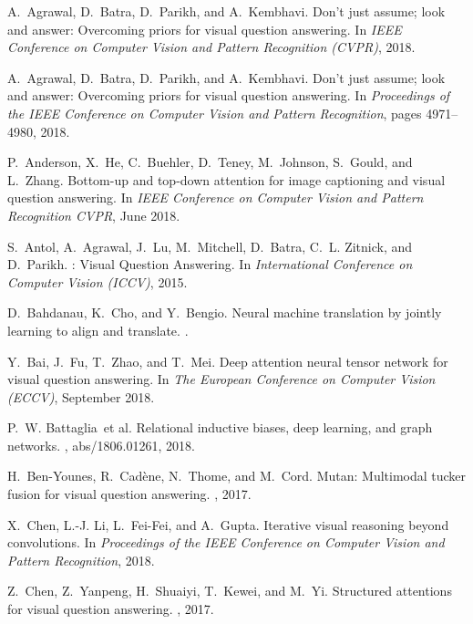 \documentclass[10pt,twocolumn,letterpaper]{article}
\begin{document}
\begin{thebibliography}{10}\itemsep=-1pt

A.~Agrawal, D.~Batra, D.~Parikh, and A.~Kembhavi.
\newblock Don't just assume; look and answer: Overcoming priors for visual
  question answering.
\newblock In {\em IEEE Conference on Computer Vision and Pattern Recognition
  (CVPR)}, 2018.

A.~Agrawal, D.~Batra, D.~Parikh, and A.~Kembhavi.
\newblock Don’t just assume; look and answer: Overcoming priors for visual
  question answering.
\newblock In {\em Proceedings of the IEEE Conference on Computer Vision and
  Pattern Recognition}, pages 4971--4980, 2018.

P.~Anderson, X.~He, C.~Buehler, D.~Teney, M.~Johnson, S.~Gould, and L.~Zhang.
\newblock Bottom-up and top-down attention for image captioning and visual
  question answering.
\newblock In {\em {IEEE} Conference on Computer Vision and Pattern Recognition
  {CVPR}}, June 2018.

S.~Antol, A.~Agrawal, J.~Lu, M.~Mitchell, D.~Batra, C.~L. Zitnick, and
  D.~Parikh.
: {V}isual {Q}uestion {A}nswering.
\newblock In {\em International Conference on Computer Vision (ICCV)}, 2015.

D.~Bahdanau, K.~Cho, and Y.~Bengio.
\newblock Neural machine translation by jointly learning to align and
  translate.
.

Y.~Bai, J.~Fu, T.~Zhao, and T.~Mei.
\newblock Deep attention neural tensor network for visual question answering.
\newblock In {\em The European Conference on Computer Vision (ECCV)}, September
  2018.

P.~W. Battaglia~et al.
\newblock Relational inductive biases, deep learning, and graph networks.
, abs/1806.01261, 2018.

H.~Ben-Younes, R.~Cad{\`{e}}ne, N.~Thome, and M.~Cord.
\newblock Mutan: Multimodal tucker fusion for visual question answering.
, 2017.

X.~Chen, L.-J. Li, L.~Fei-Fei, and A.~Gupta.
\newblock Iterative visual reasoning beyond convolutions.
\newblock In {\em Proceedings of the IEEE Conference on Computer Vision and
  Pattern Recognition}, 2018.

Z.~Chen, Z.~Yanpeng, H.~Shuaiyi, T.~Kewei, and M.~Yi.
\newblock Structured attentions for visual question answering.
, 2017.


\end{thebibliography}
\end{document}
